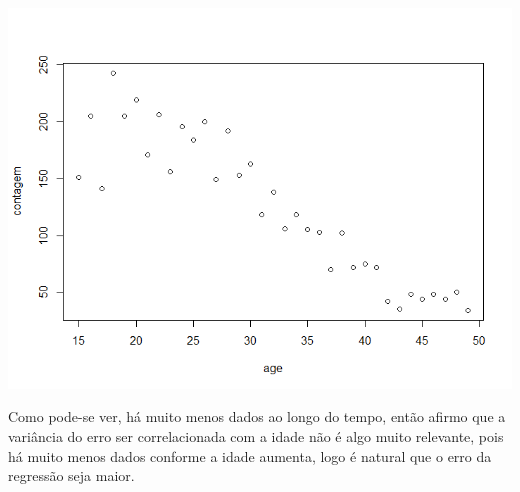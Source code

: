 \documentclass[12pt]{article}
\begin{document}
\begin{center}
	\includegraphics*[scale=0.6]{1.png}
\end{center}
Como pode-se ver, há muito menos dados ao longo do tempo, então afirmo que a variância do erro ser correlacionada com a idade não é algo muito relevante, pois há muito menos dados conforme a idade aumenta, logo é natural que o erro da regressão seja maior.
\end{document}
